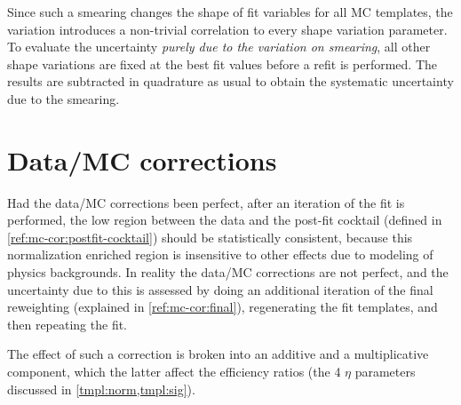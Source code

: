 Since such a smearing changes the shape of fit variables for all MC templates,
the variation introduces a non-trivial correlation to every
shape variation parameter.
To evaluate the uncertainty \emph{purely due to the variation on smearing},
all other shape variations are fixed at the best fit values before a refit is
performed.
The results are subtracted in quadrature as usual to obtain the systematic
uncertainty due to the smearing.


\section{Data/MC corrections}
\label{sys-cor-rwt}

Had the data/MC corrections been perfect,
after an iteration of the fit is performed,
the low \mmSq region between the data and the post-fit cocktail
(defined in \cref{ref:mc-cor:postfit-cocktail}) should be statistically
consistent,
because this normalization enriched region is insensitive to other effects
due to modeling of physics backgrounds.
In reality the data/MC corrections are not perfect,
and the uncertainty due to this is assessed by doing an additional iteration of
the final reweighting (explained in \cref{ref:mc-cor:final}),
regenerating the fit templates,
and then repeating the fit.

The effect of such a correction is broken into an additive and a multiplicative
component, which the latter affect the efficiency ratios
(the 4 $\eta$ parameters discussed in \cref{tmpl:norm,tmpl:sig}).

